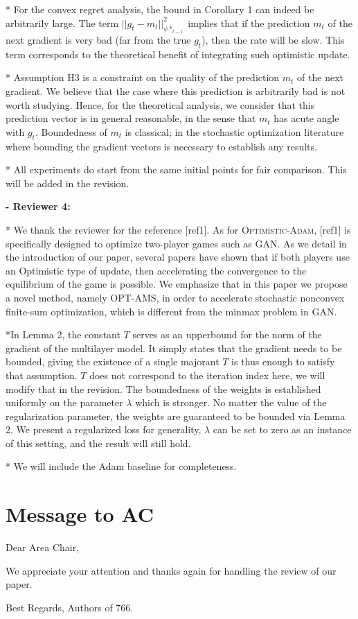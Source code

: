 \documentclass{article}
\begin{document}
* For the convex regret analysis, the bound in Corollary 1 can indeed be arbitrarily large. The term $||g_t  - m_t ||_{\psi*_{t-1}}^2$ implies that if the prediction $m_t$ of the next gradient is very bad (far from the true $g_t$), then the rate will be slow. This term corresponds to the theoretical benefit of integrating such optimistic update.

* Assumption H3 is a constraint on the quality of the prediction $m_t$ of the next gradient. We believe that the case where this prediction is arbitrarily bad is not worth studying. Hence, for the theoretical analysis, we consider that this prediction vector is in general reasonable, in the sense that $m_t$ has acute angle with $g_t$. Boundedness of $m_t$ is classical; in the stochastic optimization literature where bounding the gradient vectors is necessary to establish any results.

* All experiments do start from the same initial points for fair comparison. This will be added in the revision.

\textbf{- Reviewer 4:}

* We thank the reviewer for the reference [ref1].
As for \textsc{Optimistic-Adam}, [ref1] is specifically designed to optimize two-player games such as GAN. 
As we detail in the introduction of our paper, several papers have shown that if both players use an Optimistic type of update, then accelerating the convergence to the equilibrium of the game is possible.
We emphasize that in this paper we propose a novel method, namely OPT-AMS, in order to accelerate stochastic nonconvex finite-sum optimization, which is different from the minmax problem in GAN.

*In Lemma 2, the constant $T$ serves as an upperbound for the norm of the gradient of the multilayer model. It simply states that the gradient needs to be bounded, giving the existence of a single majorant $T$ is thus enough to satisfy that assumption. $T$ does not correspond to the iteration index here, we will modify that in the revision.
The boundedness of the weights is established uniformly on the parameter $\lambda$ which is stronger. No matter the value of the regularization parameter, the weights are guaranteed to be bounded via Lemma 2. We present a regularized loss for generality, $\lambda$ can be set to zero as an instance of this setting, and the result will still hold.

* We will include the Adam baseline for completeness.




\newpage

\section{Message to AC}



Dear Area Chair,


We appreciate your attention and thanks again for handling the review of our paper. 

Best Regards,
Authors of 766.
\end{document}
